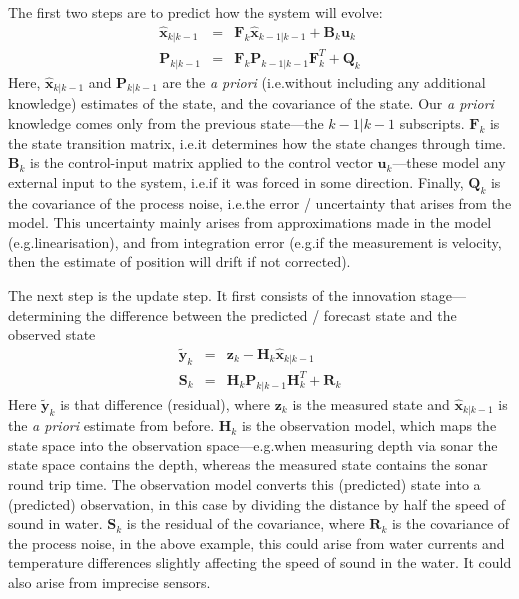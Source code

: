 \documentclass[12pt]{article}
\begin{document}
The first two steps are to predict how the system will evolve:
\begin{eqnarray}
	\mathbf{\hat{x}}_{k | k-1} &=& \mathbf{F}_k \mathbf{\hat{x}}_{k-1|k-1} + \mathbf{B}_k \mathbf{u}_k \\
	\mathbf{P}_{k|k-1} &=& \mathbf{F}_k \mathbf{P}_{k-1 | k-1} \mathbf{F}^T_k + \mathbf{Q}_k
\end{eqnarray}
Here, $\mathbf{\hat{x}}_{k | k-1}$ and $\mathbf{P}_{k|k-1}$ are the \emph{a priori} (i.e.\@ without including any additional knowledge) estimates of the state, and the covariance of the state. Our \emph{a priori} knowledge comes only from the previous state---the $k-1|k-1$ subscripts. $\mathbf{F}_k$ is the state transition matrix, i.e.\@ it determines how the state changes through time. $\mathbf{B}_k$ is the control-input matrix applied to the control vector $\mathbf{u}_k$---these model any external input to the system, i.e.\@ if it was forced in some direction. Finally, $\mathbf{Q}_k$ is the covariance of the process noise, i.e.\@ the error / uncertainty that arises from the model. This uncertainty mainly arises from approximations made in the model (e.g.\@ linearisation), and from integration error (e.g.\@ if the measurement is velocity, then the estimate of position will drift if not corrected).

The next step is the update step. It first consists of the innovation stage---determining the difference between the predicted / forecast state and the observed state
\begin{eqnarray}
	\mathbf{\tilde{y}}_k &=& \mathbf{z}_k - \mathbf{H}_k \mathbf{\hat{x}}_{k|k-1} \\
	\mathbf{S}_k &=& \mathbf{H}_k \mathbf{P}_{k|k-1} \mathbf{H}^T_k + \mathbf{R}_k
\end{eqnarray}
Here $\mathbf{\tilde{y}}_k$ is that difference (residual), where $\mathbf{z}_k$ is the measured state and $\mathbf{\hat{x}}_{k|k-1}$ is the \emph{a priori} estimate from before. $\mathbf{H}_k$ is the observation model, which maps the state space into the observation space---e.g.\@ when measuring depth via sonar the state space contains the depth, whereas the measured state contains the sonar round trip time. The observation model converts this (predicted) state into a (predicted) observation, in this case by dividing the distance by half the speed of sound in water. $\mathbf{S}_k$ is the residual of the covariance, where $\mathbf{R}_k$ is the covariance of the process noise, in the above example, this could arise from water currents and temperature differences slightly affecting the speed of sound in the water. It could also arise from imprecise sensors.
\end{document}

